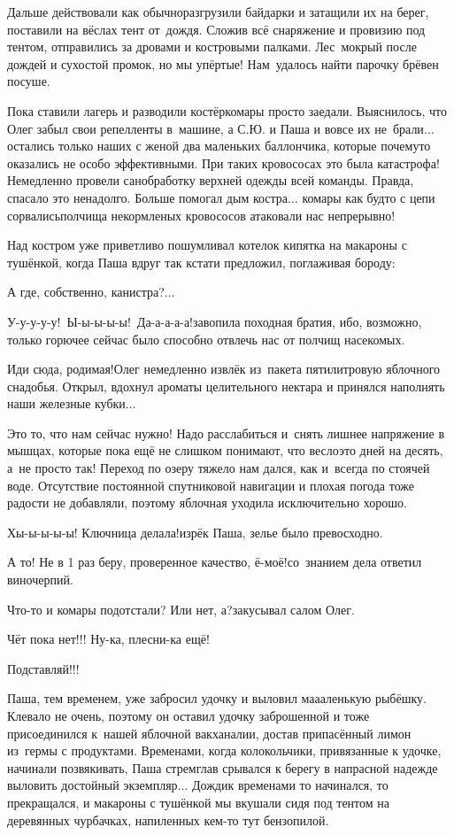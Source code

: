 Дальше действовали как обычно\mdash разгрузили байдарки и затащили их на берег, поставили на вёслах тент от~дождя. Сложив всё снаряжение и провизию под тентом, отправились за дровами и костровыми палками. Лес~мокрый после дождей и сухостой промок, но мы упёртые! Нам~удалось найти парочку брёвен посуше. 

Пока ставили лагерь и разводили костёр\mdash комары просто заедали. Выяснилось, что Олег забыл свои репелленты в~машине, а С.Ю. и Паша и вовсе их не~брали$\ldots$ остались только наших с женой два маленьких баллончика, которые почему\sdash то оказались не особо эффективными. При таких кровососах это была катастрофа! Немедленно провели санобработку верхней одежды всей команды. Правда, спасало это ненадолго. Больше помогал дым костра$\ldots$ комары как будто с цепи сорвались\mdash полчища некормленых кровососов атаковали нас непрерывно!

Над костром уже приветливо пошумливал котелок кипятка на макароны с тушёнкой, когда Паша вдруг так кстати предложил, поглаживая бороду: 

\diagdash А где, собственно, канистра?$\ldots$

\diagdash У-у-у-у-у!~Ы-ы-ы-ы-ы!~Да-а-а-а-а!\mdash завопила походная братия, ибо, возможно, только горючее сейчас было способно отвлечь нас от полчищ насекомых.
 
\diagdash Иди сюда, родимая!\mdash Олег немедленно извлёк из~пакета пятилитровую яблочного снадобья. Открыл, вдохнул ароматы целительного нектара и принялся наполнять наши железные кубки$\ldots$

Это то, что нам сейчас нужно! Надо расслабиться и~снять лишнее напряжение в мышцах, которые пока ещё не слишком понимают, что весло\mdash это дней на десять, а~не просто так! Переход по озеру тяжело нам дался, как и~всегда по стоячей воде. Отсутствие постоянной спутниковой навигации и плохая погода тоже радости не добавляли, поэтому яблочная уходила исключительно хорошо.

\diagdash Хы-ы-ы-ы-ы! Ключница делала!\mdash изрёк Паша, зелье было превосходно.

\diagdash А то! Не в 1 раз беру, проверенное качество, ё-моё!\mdash со~знанием дела ответил виночерпий.

\diagdash Что-то и комары подотстали? Или нет, а?\mdash закусывал салом Олег.

\diagdash Чёт пока нет!!! Ну-ка, плесни-ка ещё!

\diagdash Подставляй!!!

Паша, тем временем, уже забросил удочку и выловил ма\sdash а\sdash аленькую рыбёшку. Клевало не очень, поэтому он оставил удочку заброшенной и тоже присоединился к~нашей яблочной вакханалии, достав припасённый лимон из~гермы с продуктами. Временами, когда колокольчики, привязанные к удочке, начинали позвякивать, Паша стремглав срывался к берегу в напрасной надежде выловить достойный экземпляр$\ldots$ Дождик временами то начинался, то прекращался, и макароны с тушёнкой мы вкушали сидя под тентом на деревянных чурбачках, напиленных кем-то тут бензопилой. 

